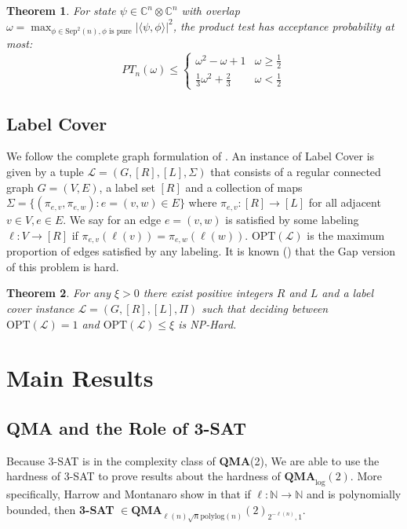 \documentclass[10pt]{article}
\newcommand{\Sep}{\textrm{Sep}}
\newcommand{\C}{\mathbb{C}}
\newcommand{\N}{\mathbb{N}}
\newtheorem{theorem}{Theorem}
\begin{document}
\begin{theorem}
    For state $\psi \in \C^{n} \otimes \C^n$ with overlap $\omega = \max_{\phi \in \Sep^2(n), \phi \text{ is pure}} |\langle \psi, \phi \rangle|^2$, the product test has acceptance probability at most: \\
$$PT_n(\omega) \le 
\begin{cases}
    \omega^2 - \omega + 1 & \omega \ge \frac{1}{2}  \\
    \frac{1}{3}\omega^2 + \frac{2}{3} & \omega < \frac{1}{2}
\end{cases}$$
\end{theorem}

\subsection{Label Cover}
We follow the complete graph formulation of \cite{pqalmost}. An instance of Label Cover is given by a tuple $\mathcal{L} = (G, [R], [L], \Sigma)$ that consists of a regular connected graph $G = (V, E)$, a label set $[R]$ and a collection of maps $\Sigma = \{(\pi_{e, v}, \pi_{e, w}) : e = (v, w) \in E \}$ where $\pi_{e,v}: [R] \to [L]$ for all adjacent $v \in V, e \in E$. We say for an edge $e = (v, w)$ is satisfied by some labeling $\ell: V \to [R]$ if $\pi_{e, v}(\ell(v)) = \pi_{e, w}(\ell(w))$. $\textrm{OPT}(\mathcal{L})$ is the maximum proportion of edges satisfied by any labeling. It is known (\cite{pqalmost}) that the Gap version of this problem is hard.

\begin{theorem}
    For any $\xi > 0$ there exist positive integers $R$ and $L$ and a label cover instance $\mathcal{L} = (G, [R], [L], \Pi)$ such that deciding between $\textrm{OPT}(\mathcal{L}) = 1$ and $\textrm{OPT}(\mathcal{L}) \leq \xi$ is NP-Hard.
\end{theorem}

\section{Main Results}

\subsection{QMA and the Role of 3-SAT}

Because 3-SAT is in the complexity class of \textbf{QMA}(2), We are able to use the hardness of 3-SAT to prove results about the hardness of $\textbf{QMA}_{\log}(2)$. More specifically, Harrow and Montanaro show in \cite{hm10} that if $\ell: \N \rightarrow \N$ and is polynomially bounded, then \textbf{3-SAT} $\in \textbf{QMA}_{\ell(n)\sqrt{n}\textrm{polylog}(n)}(2)_{2^{-\ell(n)}, 1}$.
\end{document}
